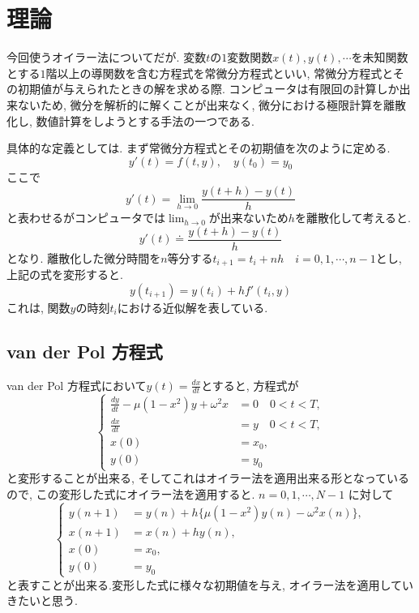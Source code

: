 \documentclass[12pt,a4paper]{jsarticle}
\begin{document}
\section{理論}
今回使うオイラー法についてだが. 変数$t$の$1$変数関数$x(t), y(t),\cdots$を未知関数とする$1$階以上の導関数を含む方程式を常微分方程式といい, 常微分方程式とその初期値が与えられたときの解を求める際. コンピュータは有限回の計算しか出来ないため, 微分を解析的に解くことが出来なく, 微分における極限計算を離散化し, 数値計算をしようとする手法の一つである.

具体的な定義としては. まず常微分方程式とその初期値を次のように定める.
$$ y'(t) = f(t, y), \quad y(t_0) = y_0$$
ここで$$ y'(t) = \lim_{h \to 0}\frac{y(t+h) - y(t)}{h} $$
と表わせるがコンピュータでは$\lim_{h \to 0}$が出来ないため$h$を離散化して考えると.
$$ y'(t) \doteq \frac{y(t+h) - y(t)}{h} $$
となり. 離散化した微分時間を$n$等分する$t_{i+1} = t_{i} + nh \quad i = 0, 1,\cdots, n-1$とし, 上記の式を変形すると.
$$ y(t_{i+1}) = y(t_i) + hf'(t_i, y) $$
これは, 関数$y$の時刻$t_i$における近似解を表している.

\subsection{van der Pol 方程式}
van der Pol 方程式において$y(t) = \frac{dx}{dt}$とすると, 方程式が
\begin{equation*}
	\left\{
	\begin{aligned}
		\frac{dy}{dt} - \mu(1 - x^2)y + \omega^2x &= 0 \quad 0 < t < T, \\
		\frac{dx}{dt} &= y \quad 0 < t < T, \\
		x(0) &= x_0, \\
		y(0) &= y_0
	\end{aligned}
	\right.
\end{equation*}
と変形することが出来る, そしてこれはオイラー法を適用出来る形となっているので, この変形した式にオイラー法を適用すると. $n = 0, 1,\cdots, N-1$ に対して
\begin{equation*}
	\left\{
	\begin{aligned}
		y(n+1) &= y(n) + h\{\mu(1 - x^2)y(n) - \omega^2x(n)\}, \\
		x(n+1) &= x(n) + hy(n), \\
		x(0) &= x_0, \\
		y(0) &= y_0
	\end{aligned}
	\right.
\end{equation*}
と表すことが出来る.変形した式に様々な初期値を与え, オイラー法を適用していきたいと思う.
\end{document}
